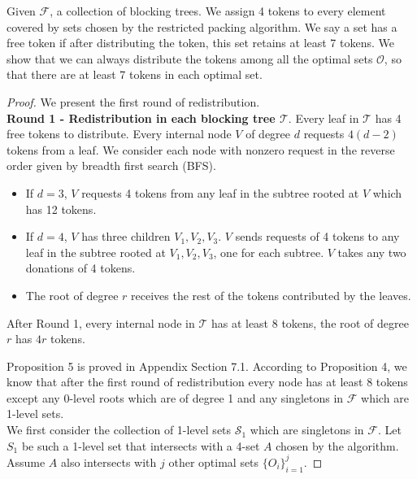 \documentclass[runningheads,a4paper]{llncs}
\numberwithin{equation}{section}
\begin{document}
Given $\mathscr{F}$, a collection of blocking trees. We assign 4 tokens to every element covered by sets chosen by the restricted packing algorithm. We say a set has a free token if after distributing the token, this set retains at least 7 tokens. We show that we can always distribute the tokens among all the optimal sets $\mathscr{O}$, so that there are at least 7 tokens in each optimal set.


\begin{proof}
We present the first round of redistribution. \\



\textbf{Round 1 - Redistribution in each blocking tree $\mathscr{T}$}. Every leaf in $\mathscr{T}$ has 4 free tokens to distribute. Every internal node $V$ of degree $d$ requests $4(d-2)$ tokens from a leaf. We consider each node with nonzero request in the reverse order given by breadth first search (BFS).


        \begin{itemize}
            \item If $d=3$, $V$ requests 4 tokens from any leaf in the subtree rooted at $V$ which has 12 tokens.
            \item If $d=4$, $V$ has three children $V_1,V_2,V_3$. $V$ sends requests of 4 tokens to any leaf in the subtree rooted at $V_1,V_2,V_3$, one for each subtree. $V$ takes any two donations of 4 tokens.
            \item The root of degree $r$ receives the rest of the tokens contributed by the leaves.
        \end{itemize}

\begin{proposition}
After Round 1, every internal node in $\mathscr{T}$ has at least 8 tokens, the root of degree $r$ has $4r$ tokens.
\label{prop1-k4}
\end{proposition}

Proposition 5 is proved in Appendix Section 7.1. According to Proposition 4, we know that after the first round of redistribution every node has at least 8 tokens except any 0-level roots which are of degree 1 and any singletons in $\mathscr{F}$ which are 1-level sets. \\

We first consider the collection of 1-level sets $\mathscr{S}_1$ which are singletons in $\mathscr{F}$. Let $S_1$ be such a 1-level set that intersects with a 4-set $A$ chosen by the algorithm. Assume $A$ also intersects with $j$ other optimal sets $\{O_i\}_{i=1}^j$.


\end{proof}
\end{document}
